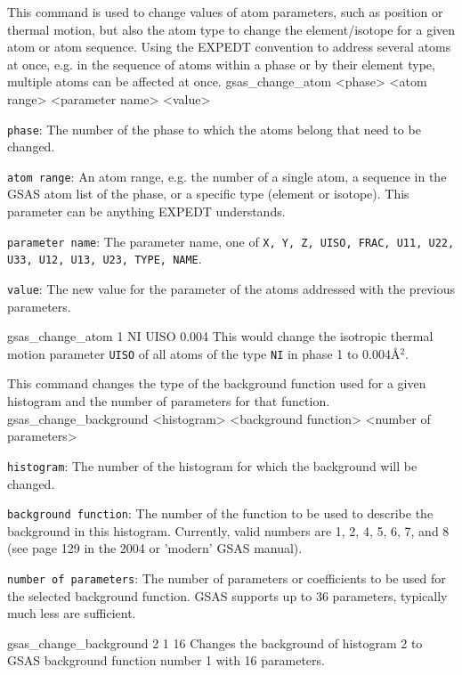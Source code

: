 {
This command is used to change values of atom parameters, such as position or thermal motion, but also the atom type to change the element/isotope for a given atom or atom sequence. Using the EXPEDT convention to address several atoms at once, e.g. in the sequence of atoms within a phase or by their element type, multiple atoms can be affected at once.
}{
gsas\_change\_atom <phase> <atom range> <parameter name> <value>
}{
\item \texttt{phase}: The number of the phase to which the atoms belong that need to be changed.
\item \texttt{atom range}: An atom range, e.g. the number of a single atom, a sequence in the GSAS atom list of the phase, or a specific type (element or isotope). This parameter can be anything EXPEDT understands.
\item \texttt{parameter name}: The parameter name, one of \texttt{X, Y, Z, UISO, FRAC, U11, U22, U33, U12, U13, U23, TYPE, NAME}.
\item \texttt{value}: The new value for the parameter of the atoms addressed with the previous parameters. 
}{
gsas\_change\_atom 1 NI UISO 0.004
}{
This would change the isotropic thermal motion parameter \texttt{UISO} of all atoms of the type \texttt{NI} in phase 1 to 0.004\AA$^2$.
}

{
This command changes the type of the background function used for a given histogram and the number of parameters for that function.
}{
gsas\_change\_background <histogram> <background function> <number of parameters>
}{
\item \texttt{histogram}: The number of the histogram for which the background will be changed.
\item \texttt{background function}: The number of the function to be used to describe the background in this histogram. Currently, valid numbers are 1, 2, 4, 5, 6, 7, and 8 (see page 129 in the 2004 or 'modern' GSAS manual).
\item \texttt{number of parameters}: The number of parameters or coefficients to be used for the selected background function. GSAS supports up to 36 parameters, typically much less are sufficient.
}{
gsas\_change\_background 2 1 16
}{
Changes the background of histogram 2 to GSAS background function number 1 with 16 parameters.
}

